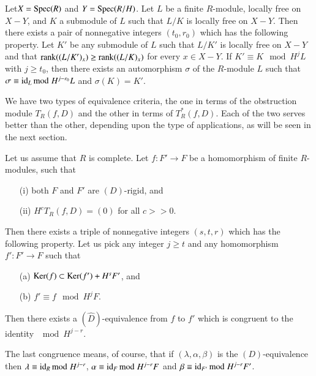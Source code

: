 \setcounter{theorem}{2}
\begin{theorem}\label{art10-sec2-thm2.3}
Let\pageoriginale $X=\operatorname{\mathrm{Spec}} (R)$ and $Y=\operatorname{\mathrm{Spec}} (R/H)$. Let $L$ be a finite $R$-module, locally free on $X-Y$, and $K$ a submodule of $L$ such that $L/K$ is locally free on $X-Y$. Then there exists a pair of nonnegative integers $(t_{0},r_{0})$ which has the following property. Let $K'$ be any submodule of $L$ such that $L/K'$ is locally free on $X-Y$ and that $\operatorname{\mathrm{rank}} ((L/K')_{x})\geq \operatorname{\mathrm{rank}} ((L/K)_{x})$ for every $x\in X-Y$. If $K'\equiv K\mod H^{j}L$ with $j\geq t_{0}$, then there exists an automorphism $\sigma$ of the $R$-module $L$ such that $\sigma\equiv \operatorname{\mathrm{id}}_{L}{\rm{mod}}\kern.3em H^{j-r_{0}}L$ and $\sigma(K)=K'$. 
\end{theorem}

We have two types of equivalence criteria, the one in terms of the obstruction module $T_{R}(f,D)$ and the other in terms of $T^{*}_{R}(f,D)$. Each of the two serves better than the other, depending upon the type of applications, as will be seen in the next section.

\begin{eqthm}\label{art10-sec2-eqthm-I}
Let us assume that $R$ is complete. Let $f:F'\to F$ be a homomorphism of finite $R$-modules, such that 
\begin{itemize}
\item[\rm(i)] both $F$ and $F'$ are $(D)$-rigid, and

\item[\rm(ii)] $H^{c}T_{R}(f,D)=(0)$ for all $c>>0$.
\end{itemize}

Then there exists a triple of nonnegative integers $(s,t,r)$ which has the following property. Let us pick any integer $j\geq t$ and any homomorphism $f':F'\to F$ such that
\begin{itemize}
\item[\rm(a)] $\operatorname{\mathrm{Ker}} (f)\subset \operatorname{\mathrm{Ker}}(f')+H^{s}F'$, and

\item[\rm(b)] $f'\equiv f\mod H^{j}F$.
\end{itemize}

Then there exists a $(\widehat{D})$-equivalence from $f$ to $f'$ which is congruent to the identity $\mod H^{j-r}$.
\end{eqthm}

The last congruence means, of course, that if $(\lambda,\alpha,\beta)$ is the $(D)$-equivalence then $\lambda\equiv \operatorname{\mathrm{id}}_{R}{\rm{mod}}\kern.3em H^{j-r}$, $\alpha\equiv \operatorname{\mathrm{id}}_{F}{\rm{mod}}\kern.3em H^{j-r}F$ and $\beta\equiv \operatorname{\mathrm{id}}_{F'}{\rm{mod}}\kern.3em H^{j-r}F'$.

